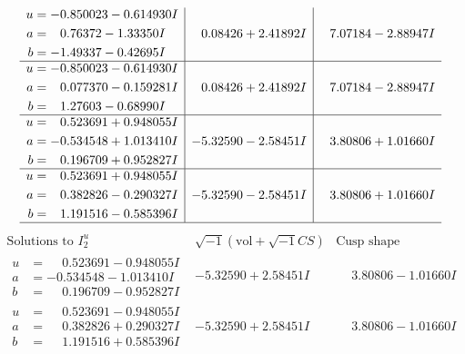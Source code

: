 \documentclass[1p]{elsarticle_modified}
\theoremstyle{definition}
\newcommand{\I}{\sqrt{-1}}
\begin{document}
$$\begin{array}{c|c|c}
\begin{aligned}
u &= -0.850023 - 0.614930 I \\
a &= \phantom{-}0.76372 - 1.33350 I \\
b &= -1.49337 - 0.42695 I\end{aligned}
 & \phantom{-}0.08426 + 2.41892 I & \phantom{-}7.07184 - 2.88947 I \\ \hline\begin{aligned}
u &= -0.850023 - 0.614930 I \\
a &= \phantom{-}0.077370 - 0.159281 I \\
b &= \phantom{-}1.27603 - 0.68990 I\end{aligned}
 & \phantom{-}0.08426 + 2.41892 I & \phantom{-}7.07184 - 2.88947 I \\ \hline\begin{aligned}
u &= \phantom{-}0.523691 + 0.948055 I \\
a &= -0.534548 + 1.013410 I \\
b &= \phantom{-}0.196709 + 0.952827 I\end{aligned}
 & -5.32590 - 2.58451 I & \phantom{-}3.80806 + 1.01660 I \\ \hline\begin{aligned}
u &= \phantom{-}0.523691 + 0.948055 I \\
a &= \phantom{-}0.382826 - 0.290327 I \\
b &= \phantom{-}1.191516 - 0.585396 I\end{aligned}
 & -5.32590 - 2.58451 I & \phantom{-}3.80806 + 1.01660 I\\
 \hline 
 \end{array}$$\newpage$$\begin{array}{c|c|c}  
\text{Solutions to }I^u_{2}& \I (\text{vol} + \sqrt{-1}CS) & \text{Cusp shape}\\
 \hline 
\begin{aligned}
u &= \phantom{-}0.523691 - 0.948055 I \\
a &= -0.534548 - 1.013410 I \\
b &= \phantom{-}0.196709 - 0.952827 I\end{aligned}
 & -5.32590 + 2.58451 I & \phantom{-}3.80806 - 1.01660 I \\ \hline\begin{aligned}
u &= \phantom{-}0.523691 - 0.948055 I \\
a &= \phantom{-}0.382826 + 0.290327 I \\
b &= \phantom{-}1.191516 + 0.585396 I\end{aligned}
 & -5.32590 + 2.58451 I & \phantom{-}3.80806 - 1.01660 I \\ \hline\begin{aligned}

\end{aligned}
\end{array}$$
\end{document}
